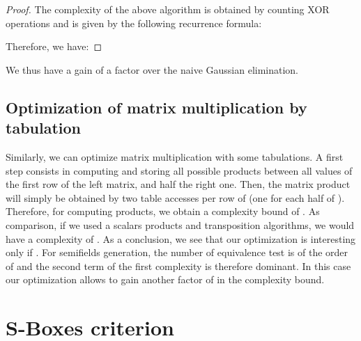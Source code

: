 \documentclass{article}\usepackage{amsthm}
\newcommand{\SBoxes}{S-Boxes\xspace}
\begin{document}
\begin{proof}
The complexity of the above algorithm is obtained by counting XOR operations and is given by the following recurrence formula:  

Therefore, we have:

\end{proof}
We thus have a gain of a factor  over the naive Gaussian
elimination. 









\subsection{Optimization of matrix multiplication by tabulation}



Similarly, we can optimize matrix multiplication with some tabulations. 
A first step consists in computing and storing all
possible products between all values of the first row of the left matrix, and
half the right one. Then, the matrix product  will simply  be
obtained by two table accesses per row of  (one for each half of
). Therefore, for computing  products, 
we obtain a complexity bound of . 
As comparison, if we used a scalars products and transposition algorithms, we
would have a complexity of . As a conclusion, we see that our
optimization is interesting only if . 
For semifields generation, the number of equivalence test is of the order of  and the second term of the first complexity is therefore dominant.
In this case our optimization allows to gain another factor of  in the complexity bound. 








\section{\SBoxes criterion}\label{sec:crit}
\end{document}

